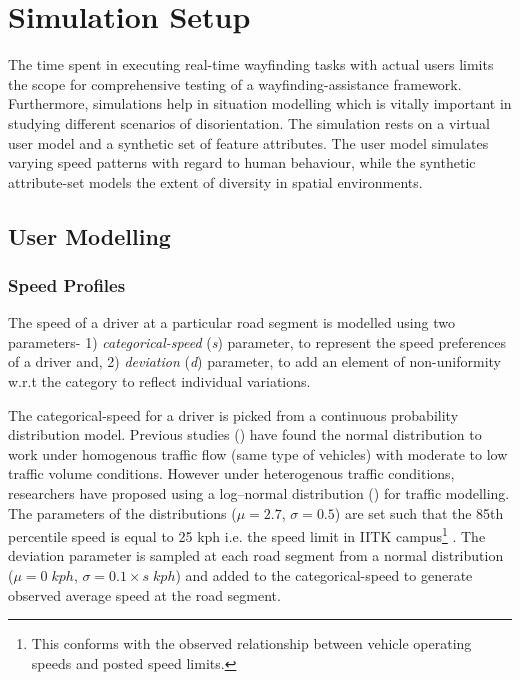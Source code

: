 \documentclass{iitkthesis}
\begin{document}
 \section{Simulation Setup} 
The time spent in executing real-time wayfinding tasks with actual
users limits the scope 
for comprehensive testing of a wayfinding-assistance framework. Furthermore,
simulations help in situation modelling which is vitally important in 
studying different scenarios of disorientation. The simulation rests on a 
virtual user model and a synthetic set of feature attributes. The user model 
simulates varying speed patterns with regard to human behaviour, while 
the synthetic attribute-set models the extent of diversity in spatial 
environments.
  \subsection{User Modelling}
  \subsubsection*{Speed Profiles}
The speed of a driver at a particular road segment is modelled using two 
parameters- 1) \textit{categorical-speed} (\textit{s}) parameter, to represent the 
speed preferences of a driver and, 2) \textit{deviation} (\textit{d}) parameter, to 
add an element of non-uniformity w.r.t the category to reflect individual
variations.

The categorical-speed for a driver is picked from a continuous 
probability distribution model. Previous studies (\cite{leong,mclean}) 
have found the normal distribution to work under homogenous traffic flow 
(same type of vehicles) with moderate to low traffic volume conditions. 
However under heterogenous traffic conditions, researchers have proposed 
using a log–normal distribution (\cite{gerl}) for traffic modelling. 
The parameters of the distributions ($\mu= 2.7$, $\sigma=0.5$) are set such 
that the 85th percentile speed is equal to 25 kph i.e. the speed limit in 
IITK campus\footnote{This conforms with the observed relationship 
between vehicle operating speeds and posted speed limits.} . The 
deviation parameter is sampled at each road segment from a normal 
distribution ($\mu=0\;kph$, $\sigma=0.1\times s\;kph$) and added to the 
categorical-speed to generate observed average speed at the road 
segment.
\end{document}
